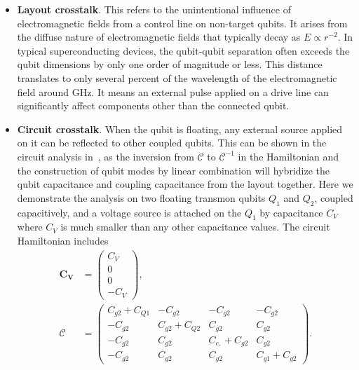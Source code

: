 \documentclass[a4paper,onecolumn,11pt,unpublished]{quantumarticle}
\newcommand{\VEC}[1]{\mathbf{#1}}
\begin{document}
\begin{itemize}
  \item \textbf{Layout crosstalk}. This refers to the unintentional influence of electromagnetic fields from a control line on non-target qubits. It arises from the diffuse nature of electromagnetic fields that typically decay as $E\propto r^{-2}$. In typical superconducting devices, the qubit-qubit separation often exceeds the qubit dimensions by only one order of magnitude or less. This distance translates to only several percent of the wavelength of the electromagnetic field around GHz. It means an external pulse applied on a drive line can significantly affect components other than the connected qubit. 
  \item \textbf{Circuit crosstalk}. When the qubit is floating, any external source applied on it can be reflected to other coupled qubits. This can be shown in the circuit analysis in~, as the inversion from $\mathcal{C}$ to $\mathcal{C}^{-1}$ in the Hamiltonian and the construction of qubit modes by linear combination will hybridize the qubit capacitance and coupling capacitance from the layout together. Here we demonstrate the analysis on two floating transmon qubits $Q_1$ and $Q_2$, coupled capacitively, and a voltage source is attached on the $Q_1$ by capacitance $C_V$ where $C_V$ is much smaller than any other capacitance values. The circuit Hamiltonian includes
        \begin{align}
          \VEC{C_V}   & = \begin{pmatrix} C_V \\ 0 \\ 0 \\ -C_V\end{pmatrix}, \label{eq:2q_capacitive_circuit_cv_raw} \\
          \mathcal{C} & = \begin{pmatrix}
                            C_{g2}+C_{Q1} & -C_{g2}       & -C_{g2}       & -C_{g2}       \\
                            -C_{g2}       & C_{g2}+C_{Q2} & C_{g2}        & C_{g2}        \\
                            -C_{g2}       & C_{g2}        & C_{c,}+C_{g2} & C_{g2}        \\
                            -C_{g2}       & C_{g2}        & C_{g2}        & C_{g1}+C_{g2}
                          \end{pmatrix}. \label{eq:2q_capacitive_circuit_c_raw}
        \end{align}

\end{itemize}
\end{document}
